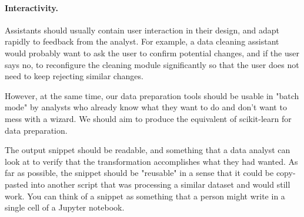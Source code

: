 \documentclass[sigplan,preprint,10pt]{acmart}\settopmatter{printfolios=true,printccs=false,printacmref=false}
\theoremstyle{plain}
\theoremstyle{definition}
\begin{document}
{\paragraph{Interactivity.}
Assistants should usually contain user interaction in their design, and adapt rapidly to feedback 
from the analyst. For example, a data cleaning assistant would probably want to ask the user to 
confirm potential changes, and if the user says no, to reconfigure the cleaning module 
significantly so that the user does not need to keep rejecting similar changes. 

However, at the same time, our data preparation tools should be usable in "batch mode" by analysts 
who already know what they want to do and don't want to mess with a wizard. We should aim to 
produce the equivalent of scikit-learn for data preparation.

The output snippet should be readable, and something that a data analyst can look at to verify 
that the transformation accomplishes what they had wanted. As far as possible, the snippet 
should be "reusable" in a sense that it could be copy-pasted into another script that was 
processing a similar dataset and would still work. You can think of a snippet as something 
that a person might write in a single cell of a Jupyter notebook.
}
\end{document}
